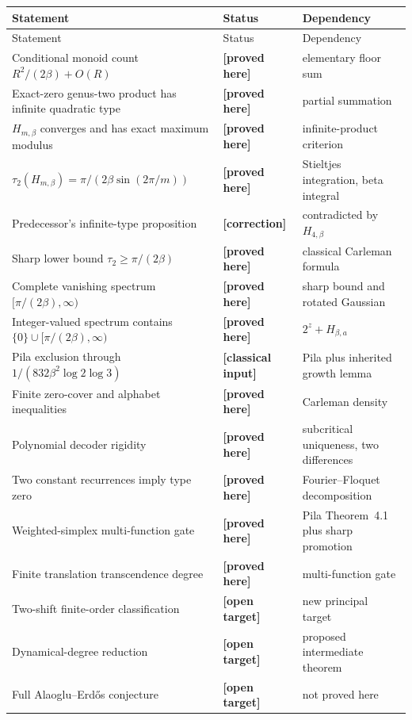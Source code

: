 \documentclass[11pt,oneside]{article}
\theoremstyle{definition}
\theoremstyle{remark}
\newcommand{\statusproved}{\textcolor{provedgreen}{\textbf{[proved here]}}}
\newcommand{\statuscorrection}{\textcolor{correctionred}{\textbf{[correction]}}}
\newcommand{\statusclassical}{\textcolor{classicalblue}{\textbf{[classical input]}}}
\newcommand{\statusopen}{\textcolor{openviolet}{\textbf{[open target]}}}
\begin{document}
\begin{longtable}{@{}p{}p{}p{}@{}}
\toprule
Statement & Status & Dependency\\
\midrule
\endfirsthead
\toprule
Statement & Status & Dependency\\
\midrule
\endhead
Conditional monoid count $R^2/(2\beta)+O(R)$ & \statusproved & elementary floor sum\\
Exact-zero genus-two product has infinite quadratic type & \statusproved & partial summation\\
$H_{m,\beta}$ converges and has exact maximum modulus & \statusproved & infinite-product criterion\\
$\tau_2(H_{m,\beta})=\pi/(2\beta\sin(2\pi/m))$ & \statusproved & Stieltjes integration, beta integral\\
Predecessor's infinite-type proposition & \statuscorrection & contradicted by $H_{4,\beta}$\\
Sharp lower bound $\tau_2\ge\pi/(2\beta)$ & \statusproved & classical Carleman formula\\
Complete vanishing spectrum $[\pi/(2\beta),\infty)$ & \statusproved & sharp bound and rotated Gaussian\\
Integer-valued spectrum contains $\{0\}\cup[\pi/(2\beta),\infty)$ & \statusproved & $2^z+H_{\beta,a}$\\
Pila exclusion through $1/(832\beta^2\log2\log3)$ & \statusclassical & Pila plus inherited growth lemma\\
Finite zero-cover and alphabet inequalities & \statusproved & Carleman density\\
Polynomial decoder rigidity & \statusproved & subcritical uniqueness, two differences\\
Two constant recurrences imply type zero & \statusproved & Fourier--Floquet decomposition\\
Weighted-simplex multi-function gate & \statusproved & Pila Theorem~4.1 plus sharp promotion\\
Finite translation transcendence degree & \statusproved & multi-function gate\\
Two-shift finite-order classification & \statusopen & new principal target\\
Dynamical-degree reduction & \statusopen & proposed intermediate theorem\\
Full Alaoglu--Erd\H{o}s conjecture & \statusopen & not proved here\\
\bottomrule
\end{longtable}
\end{document}
